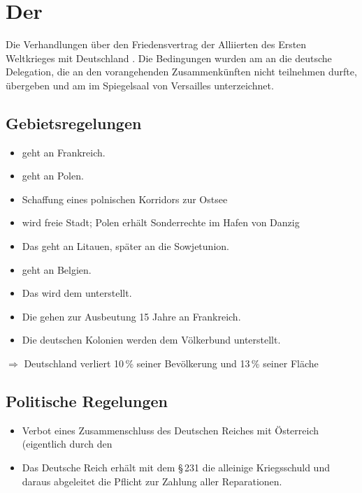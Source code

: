 \section{Der }
\label{sec:vvv}

Die Verhandlungen über den Friedensvertrag der Alliierten des Ersten
Weltkrieges mit Deutschland 
. Die Bedingungen wurden am  an die
deutsche Delegation, die an den vorangehenden Zusammenkünften nicht
teilnehmen durfte, übergeben und am  im Spiegelsaal
 von Versailles unterzeichnet.

\subsection*{Gebietsregelungen}

\begin{itemize}
\item {} geht an Frankreich.
\item {} geht an Polen.
\item Schaffung eines polnischen Korridors zur Ostsee
\item {} wird freie Stadt; Polen erhält Sonderrechte im
Hafen von Danzig
\item Das  geht an Litauen, später an die
Sowjetunion.
\item {} geht an Belgien.
\item Das  wird dem  unterstellt.
\item Die  gehen zur Ausbeutung 15 Jahre an
Frankreich.
\item Die deutschen Kolonien werden dem
Völkerbund unterstellt.
\end{itemize}

\noindent $\Longrightarrow$ Deutschland verliert 10\,\% seiner
Bevölkerung und 13\,\% seiner Fläche


\subsection*{Politische Regelungen}

\begin{itemize}
\item Verbot eines Zusammenschluss des Deutschen Reiches mit
Österreich (eigentlich durch den 
\item Das Deutsche Reich erhält mit dem §\,231 die alleinige
Kriegsschuld und daraus abgeleitet die Pflicht zur Zahlung aller
Reparationen.  
\end{itemize}


